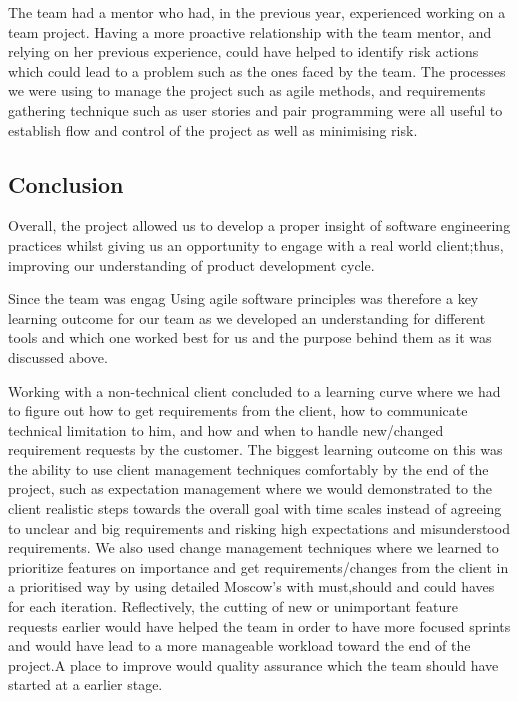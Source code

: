 \documentclass{l3proj}
\begin{document}
The team had a mentor who had, in the previous year, experienced working on a team project. Having a more proactive relationship with the team mentor, and relying on her previous experience,  could have helped to identify risk actions which could lead to a problem such as the ones faced by the team. The processes we were using to manage the project such as agile methods, and requirements gathering technique such as user stories and pair programming were all useful to establish flow and control of the project as well as minimising risk.


\subsection{Conclusion }

Overall, the project allowed us to develop a proper insight of software engineering practices whilst giving us an opportunity to engage with a real world client;thus, improving our understanding of product development cycle.


Since the team was engag
Using agile software principles was therefore a key learning outcome for our team as we developed an understanding for different tools and which one worked best for us and the purpose behind them as it was discussed above. 

Working with a non-technical client concluded to a learning curve where we had to figure out how to get requirements from the client, how to communicate technical limitation to him, and how and when to handle new/changed requirement requests by the customer. The biggest learning outcome on this was the ability to use client management techniques comfortably by the end of the project,  such as expectation management where we would demonstrated to the client realistic steps towards the overall goal with time scales instead of agreeing to unclear and big requirements and risking high expectations and misunderstood requirements. We also used change management techniques where we learned to prioritize features on importance and get requirements/changes from the client in a prioritised way by using detailed Moscow's with must,should and could haves for each iteration. Reflectively, the cutting of new or unimportant feature requests earlier would have helped the team in order to have more focused sprints and would have lead to a more manageable workload toward the end of the project.A place to improve would quality assurance which the team should have started at a earlier stage.
\end{document}

